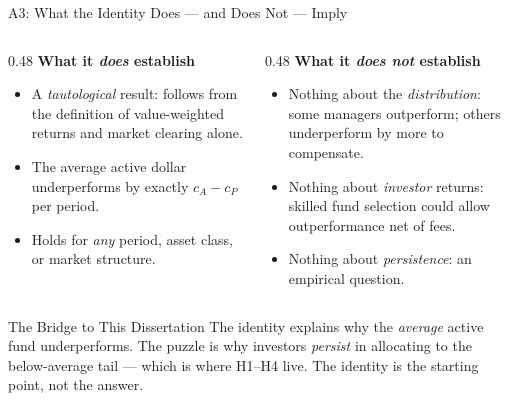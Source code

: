 \documentclass[10pt, aspectratio=169]{beamer}
\begin{document}
\begin{frame}{A3: What the Identity Does — and Does Not — Imply}
  \begin{columns}[T]
    \begin{column}{0.48\textwidth}
      \small\textbf{What it \emph{does} establish}
      \begin{itemize}\itemsep2pt
        \item A \emph{tautological} result: follows from the definition
              of value-weighted returns and market clearing alone.
        \item The average active dollar underperforms by exactly
              $c_A - c_P$ per period.
        \item Holds for \emph{any} period, asset class, or market structure.
      \end{itemize}
    \end{column}
    \begin{column}{0.48\textwidth}
      \small\textbf{What it \emph{does not} establish}
      \begin{itemize}\itemsep2pt
        \item Nothing about the \emph{distribution}: some managers
              outperform; others underperform by more to compensate.
        \item Nothing about \emph{investor} returns: skilled fund
              selection could allow outperformance net of fees.
        \item Nothing about \emph{persistence}: an empirical question.
      \end{itemize}
    \end{column}
  \end{columns}
  \vspace{5pt}
  \begin{block}{The Bridge to This Dissertation}
    \small The identity explains why the \emph{average} active fund underperforms.
    The puzzle is why investors \emph{persist} in allocating to the below-average
    tail — which is where H1–H4 live.
    The identity is the starting point, not the answer.
  \end{block}
\end{frame}

\end{document}
